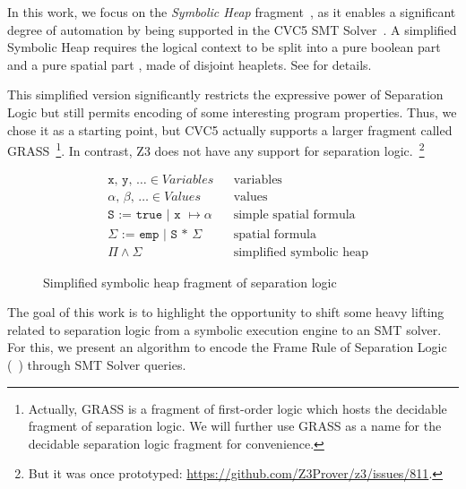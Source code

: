 \documentclass[sigplan,screen,review]{acmart}
\begin{document}
In this work, we focus on the \emph{Symbolic Heap} fragment~\cite{DBLP:conf/fmco/BerdineCO05}, as it enables a significant degree of automation by being supported in the CVC5 SMT Solver~\cite{DBLP:conf/tacas/BarbosaBBKLMMMN22}. A simplified Symbolic Heap requires the logical context to be split into a pure boolean part and a pure spatial part , made of disjoint heaplets. See  for details.

This simplified version significantly restricts the expressive power of Separation Logic but still permits encoding of some interesting program properties. Thus, we chose it as a starting point, but CVC5 actually supports a larger fragment called GRASS~\cite{DBLP:conf/cav/PiskacWZ13}\footnote{Actually, GRASS is a fragment of first-order logic which hosts the decidable fragment of separation logic. We will further use GRASS as a name for the decidable separation logic fragment for convenience.}. In contrast, Z3\cite{DBLP:conf/tacas/MouraB08} does not have any support for separation logic.~\footnote{But it was once prototyped: \url{https://github.com/Z3Prover/z3/issues/811}.} 

\begin{figure}
\begin{prittybox}
\begin{align*}
    &\texttt{x, y, $\dots$} \in Variables &&\text{variables}\\
    &\texttt{$\alpha$, $\beta$, $\dots$} \in Values &&\text{values}\\
    &\texttt{S := true | x $\mapsto \alpha$} &&\text{simple spatial formula}\\
    &\texttt{$\Sigma$ := emp | S * $\Sigma$} &&\text{spatial formula}\\
    &\Pi \land \Sigma &&\text{simplified symbolic heap}
\end{align*}

\begin{prooftree}
\end{prooftree}
\caption{Simplified symbolic heap fragment of separation logic}
\end{prittybox}

\label{fig:framerule}
\end{figure}


The goal of this work is to highlight the opportunity to shift some heavy lifting related to separation logic from a symbolic execution engine to an SMT solver. For this, we present an algorithm to encode the Frame Rule of Separation Logic (~) through SMT Solver queries.
\end{document}
